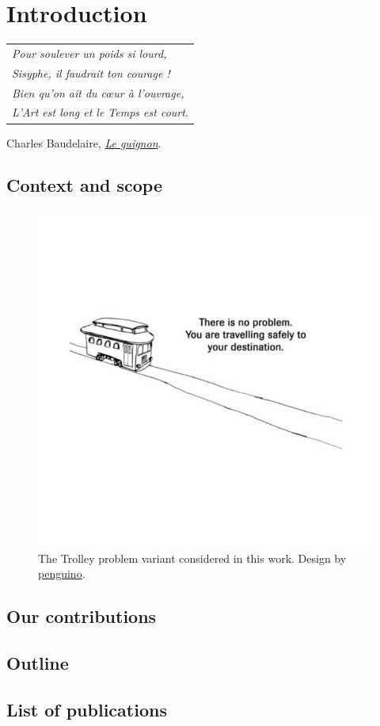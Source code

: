 
\graphicspath{{2-Chapters/1-Chapter/}}

\chapter{Introduction}
\label{chapter:1}

\begin{flushright}
	\begin{tabular}{@{}l@{}}
		\emph{Pour soulever un poids si lourd,}\\
		\emph{Sisyphe, il faudrait ton courage !}\\
		\emph{Bien qu’on ait du cœur à l’ouvrage,}\\
		\emph{L’Art est long et le Temps est court.}\\
	\end{tabular}
	
	Charles Baudelaire, \href{https://eleurent.github.io/sisyphe/texts/le-guignon.html}{\emph{Le guignon}}.
\end{flushright}

\section{Context and scope}


\begin{figure}[tp]
	\centering
	\includegraphics[trim={0 5cm 0 5cm}, clip, width=0.7\linewidth]{img/trolley}
	\caption{The Trolley problem variant considered in this work. Design by \href{https://www.teepublic.com/fr/pin/685858-there-is-no-problem.-you-are-travelling-safely-to-}{penguino}.}
\end{figure}

\section{Our contributions}
\section{Outline}
\section{List of publications}